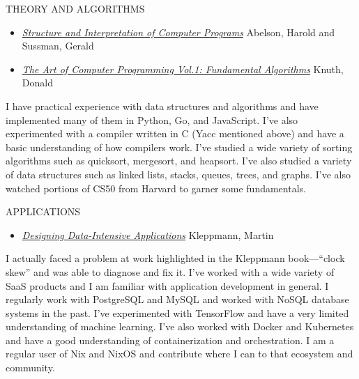 \documentclass[12pt]{report}
\begin{document}
THEORY AND ALGORITHMS
\begin{itemize}
        \item \href{https://en.wikipedia.org/wiki/Structure_and_Interpretation_of_Computer_Programs}{\emph {Structure and Interpretation of Computer Programs}} Abelson, Harold and Sussman, Gerald
        \item \href{https://www-cs-faculty.stanford.edu/~knuth/taocp.html}{\emph {The Art of Computer Programming Vol.1: Fundamental Algorithms}} Knuth, Donald
\end{itemize}
I have practical experience with data structures and algorithms and have implemented many of them in Python, Go, and JavaScript. I've also experimented  with a compiler written in C (Yacc mentioned above) and have a basic understanding of how compilers work. I've studied a wide variety of sorting algorithms such as quicksort, mergesort, and heapsort. I've also studied a variety of data structures such as linked lists, stacks, queues, trees, and graphs. I've also watched portions of CS50 from Harvard to garner some fundamentals.\hfill \break

APPLICATIONS
\begin{itemize}
        \item \href{https://dataintensive.net/}{\emph {Designing Data-Intensive Applications}} Kleppmann, Martin
\end{itemize}
I actually faced a problem at work highlighted in the Kleppmann book---``clock skew'' and was able to diagnose and fix it. I've worked with a wide variety of SaaS products and I am familiar with application development in general.
I regularly work with PostgreSQL and MySQL and worked with NoSQL database systems in the past. I've experimented with TensorFlow and have a very limited understanding of machine learning. I've also worked with Docker and Kubernetes and have a good understanding of containerization and orchestration. I am a regular user of Nix and NixOS and contribute where I can to that ecosystem and community.\hfill \break
\end{document}
